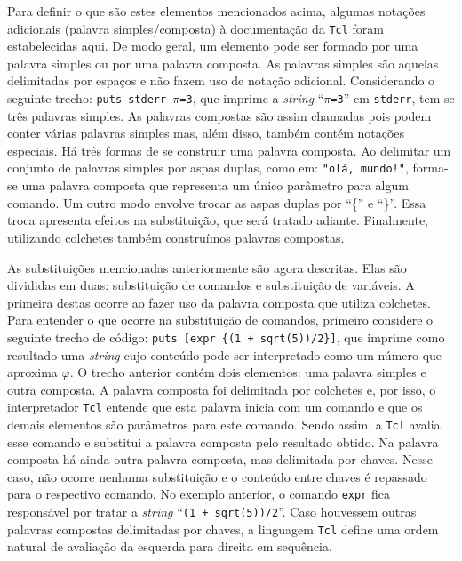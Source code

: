 Para definir o que são estes elementos mencionados acima, algumas
notações adicionais (palavra simples/composta) à documentação da \texttt{Tcl}
\cite{Tcl.n-manpage} foram estabelecidas aqui. De modo geral, um
elemento pode ser formado por uma palavra simples ou por uma palavra
composta. As palavras simples são
aquelas delimitadas por espaços e não fazem uso de notação adicional.
Considerando o seguinte trecho:
\texttt{puts stderr $\pi$=3},
 que imprime a \textit{string} ``\texttt{$\pi$=3}''
em \verb!stderr!, tem-se três palavras simples. As palavras compostas
são assim chamadas pois podem conter várias palavras simples mas, além
disso, também contém notações especiais. Há três formas de se
construir uma palavra composta. Ao delimitar um conjunto de
palavras simples por aspas duplas, como em: \verb|"olá, mundo!"|,
forma-se uma palavra composta que representa um único parâmetro para
algum comando. Um outro modo envolve trocar as aspas duplas por ``\{''
e ``\}''. Essa troca apresenta efeitos na substituição, que será
tratado adiante. Finalmente, utilizando colchetes também construímos
palavras compostas.

As substituições mencionadas anteriormente são agora descritas. Elas
são divididas em duas: substituição de comandos e substituição de
variáveis. A primeira destas ocorre ao fazer uso da palavra composta
que utiliza colchetes. Para entender o que ocorre na substituição de
comandos, primeiro considere o seguinte trecho de código:
\verb!puts [expr {(1 + sqrt(5))/2}]!, que imprime como resultado
uma \textit{string} cujo conteúdo pode ser interpretado como um número
que aproxima $\varphi$.
O trecho anterior contém dois
elementos: uma palavra simples e outra composta. A palavra composta foi
delimitada por colchetes e, por isso, o interpretador \texttt{Tcl}
entende que esta palavra inicia com um comando e que os demais
elementos são parâmetros para este comando. Sendo assim, a
\texttt{Tcl} avalia esse comando e substitui a palavra composta pelo
resultado obtido. Na palavra composta há ainda outra palavra composta,
mas delimitada por chaves. Nesse caso, não ocorre nenhuma substituição
e o conteúdo entre chaves é repassado para o respectivo comando. No
exemplo anterior, o comando \verb!expr! fica responsável por tratar a
\textit{string} ``\verb!(1 + sqrt(5))/2!''. Caso houvessem outras
palavras compostas delimitadas por chaves, a linguagem \texttt{Tcl}
define uma ordem natural de avaliação da esquerda para direita em
sequência.


